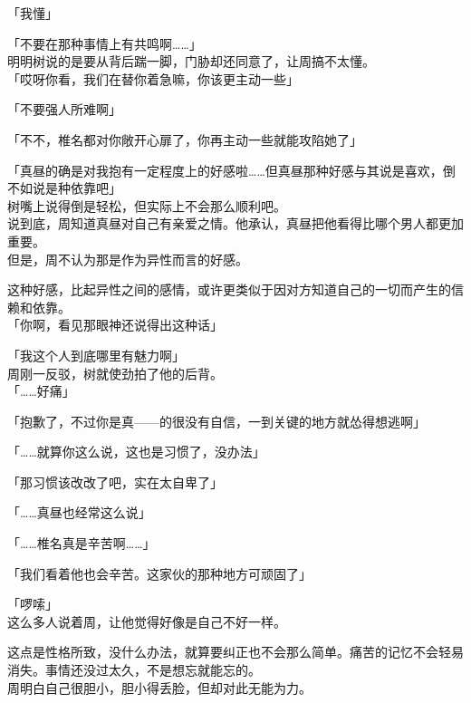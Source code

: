 「我懂」

「不要在那种事情上有共鸣啊……」\\

明明树说的是要从背后踹一脚，门胁却还同意了，让周搞不太懂。\\

「哎呀你看，我们在替你着急嘛，你该更主动一些」

「不要强人所难啊」

「不不，椎名都对你敞开心扉了，你再主动一些就能攻陷她了」

「真昼的确是对我抱有一定程度上的好感啦……但真昼那种好感与其说是喜欢，倒不如说是种依靠吧」\\

树嘴上说得倒是轻松，但实际上不会那么顺利吧。\\

说到底，周知道真昼对自己有亲爱之情。他承认，真昼把他看得比哪个男人都更加重要。\\

但是，周不认为那是作为异性而言的好感。

这种好感，比起异性之间的感情，或许更类似于因对方知道自己的一切而产生的信赖和依靠。\\

「你啊，看见那眼神还说得出这种话」

「我这个人到底哪里有魅力啊」\\

周刚一反驳，树就使劲拍了他的后背。\\

「……好痛」

「抱歉了，不过你是真——的很没有自信，一到关键的地方就怂得想逃啊」

「……就算你这么说，这也是习惯了，没办法」

「那习惯该改改了吧，实在太自卑了」

「……真昼也经常这么说」

「……椎名真是辛苦啊……」

「我们看着他也会辛苦。这家伙的那种地方可顽固了」

「啰嗦」\\

这么多人说着周，让他觉得好像是自己不好一样。

这点是性格所致，没什么办法，就算要纠正也不会那么简单。痛苦的记忆不会轻易消失。事情还没过太久，不是想忘就能忘的。\\

周明白自己很胆小，胆小得丢脸，但却对此无能为力。\\

